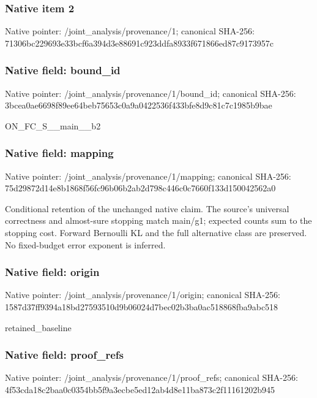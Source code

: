 \documentclass[10pt,a4paper]{article}
\begin{document}
\subsubsection{Native item 2}
Native pointer: /joint\_\allowbreak{}analysis/provenance/1; canonical SHA-256: 71306bc229693e33bcf6a394d3e88691c923ddfa8933f671866ed87c9173957c

\subsubsection{Native field: bound\_\allowbreak{}id}
Native pointer: /joint\_\allowbreak{}analysis/provenance/1/bound\_\allowbreak{}id; canonical SHA-256: 3bcea0ae6698f89ee64beb75653c0a9a0422536f433bfe8d9c81c7c1985b9bae

\begingroup\raggedright\sloppy ON\_\allowbreak{}FC\_\allowbreak{}S\_\allowbreak{}\_\allowbreak{}main\_\allowbreak{}\_\allowbreak{}b2\par\endgroup

\subsubsection{Native field: mapping}
Native pointer: /joint\_\allowbreak{}analysis/provenance/1/mapping; canonical SHA-256: 75d29872d14e8b1868f56fc96b06b2ab2d798c446c0c7660f133d150042562a0

\begingroup\raggedright\sloppy Conditional retention of the unchanged native claim. The source's universal correctness and almost-sure stopping match main/\allowbreak{}g1;\allowbreak{} expected counts sum to the stopping cost. Forward Bernoulli KL and the full alternative class are preserved. No fixed-budget error exponent is inferred.\par\endgroup

\subsubsection{Native field: origin}
Native pointer: /joint\_\allowbreak{}analysis/provenance/1/origin; canonical SHA-256: 1587d37ff9394a18bd27593510d9b06024d7bec02b3ba0ac518868fba9abc518

\begingroup\raggedright\sloppy retained\_\allowbreak{}baseline\par\endgroup

\subsubsection{Native field: proof\_\allowbreak{}refs}
Native pointer: /joint\_\allowbreak{}analysis/provenance/1/proof\_\allowbreak{}refs; canonical SHA-256: 4f53cda18c2baa0c0354bb5f9a3ecbe5ed12ab4d8e11ba873c2f11161202b945
\end{document}
